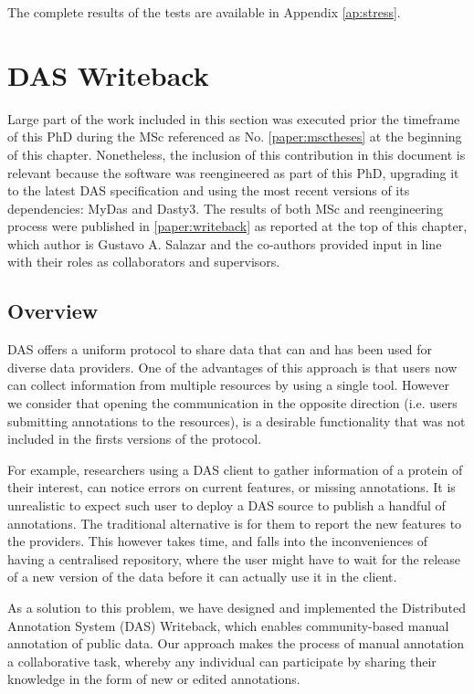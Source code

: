 The complete results of the tests are available in Appendix \ref{ap:stress}.


\section{DAS Writeback}\label{section:writeback}

Large part of the work included in this section was executed prior the timeframe of this PhD during the MSc referenced as No. \ref{paper:msctheses} at the beginning of this chapter. Nonetheless, the inclusion of this contribution in this document is relevant because the software was reengineered as part of this PhD, upgrading it to the latest DAS specification and using the most recent versions of its dependencies: MyDas and Dasty3. The results of both MSc and reengineering process were published in \ref{paper:writeback} as reported at the top of this chapter, which author is Gustavo A. Salazar and the co-authors provided input in line with their roles as collaborators and supervisors. 

\subsection{Overview}
DAS offers a uniform protocol to share data that can and has been used for diverse data providers. One of the advantages of this approach is that users now can collect information from multiple resources by using a single tool. However we consider that opening the communication in the opposite direction (i.e. users submitting annotations to the resources), is a desirable functionality that was not included in the firsts versions of the protocol.

For example, researchers using a DAS client to gather information of a protein of their interest, can notice errors on current features, or missing annotations. It is unrealistic to expect such user to deploy a DAS source to publish a handful of annotations. The traditional alternative is for them to report the new features to the providers. This however takes time, and falls into the inconveniences of having a centralised repository, where the user might have to wait for the release of a new version of the data before it can actually use it in the client.

As a solution to this problem, we have designed and implemented the Distributed Annotation System (DAS) Writeback, which enables community-based manual annotation of public data. Our approach makes the process of manual annotation a collaborative task, whereby any individual can participate by sharing their knowledge in the form of new or edited annotations.

